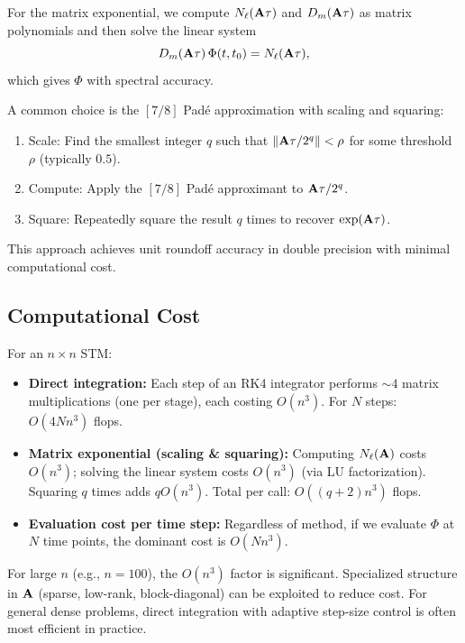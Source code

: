 For the matrix exponential, we compute $N_\ell(\mathbf{A}\tau)$ and $D_m(\mathbf{A}\tau)$ as matrix polynomials and
then solve the linear system
\begin{equation}
D_m(\mathbf{A}\tau)\,\Phi(t,t_0) = N_\ell(\mathbf{A}\tau),
\label{eq:ch2:pade-solve}
\end{equation}
which gives $\Phi$ with spectral accuracy.

A common choice is the $[7/8]$ Padé approximation with scaling and squaring:
\begin{enumerate}
\item Scale: Find the smallest integer $q$ such that $\|\mathbf{A}\tau / 2^q\| < \rho$ for some threshold $\rho$ (typically $0.5$).
\item Compute: Apply the $[7/8]$ Padé approximant to $\mathbf{A}\tau/2^q$.
\item Square: Repeatedly square the result $q$ times to recover $\exp(\mathbf{A}\tau)$.
\end{enumerate}

This approach achieves unit roundoff accuracy in double precision with minimal computational cost.

\subsection{Computational Cost}

For an $n\times n$ STM:
\begin{itemize}
\item \textbf{Direct integration:} Each step of an RK4 integrator performs $\sim 4$ matrix multiplications
      (one per stage), each costing $O(n^3)$. For $N$ steps: $O(4Nn^3)$ flops.
\item \textbf{Matrix exponential (scaling \& squaring):} Computing $N_\ell(\mathbf{A})$ costs $O(n^3)$; solving
      the linear system costs $O(n^3)$ (via LU factorization). Squaring $q$ times adds $qO(n^3)$. Total per call:
      $O((q+2)n^3)$ flops.
\item \textbf{Evaluation cost per time step:} Regardless of method, if we evaluate $\Phi$ at $N$ time points,
      the dominant cost is $O(Nn^3)$.
\end{itemize}

For large $n$ (e.g., $n=100$), the $O(n^3)$ factor is significant. Specialized structure in $\mathbf{A}$ (sparse,
low-rank, block-diagonal) can be exploited to reduce cost. For general dense problems, direct integration
with adaptive step-size control is often most efficient in practice.

